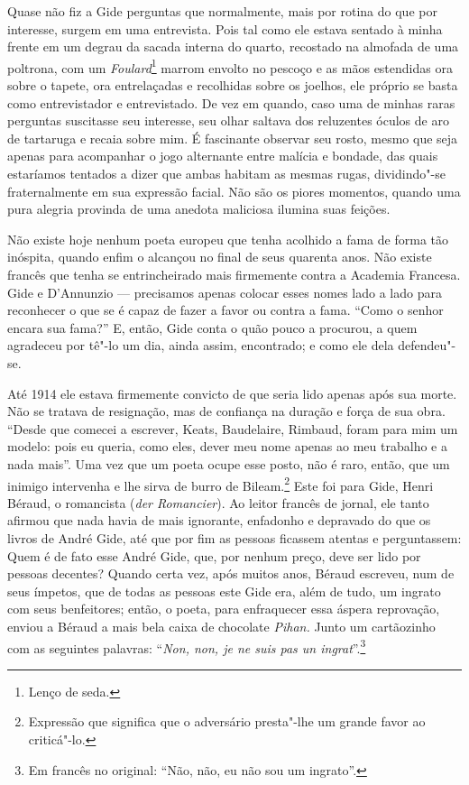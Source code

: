 Quase não fiz a Gide perguntas que normalmente, mais por rotina do que
por interesse, surgem em uma entrevista. Pois tal como ele estava
sentado à minha frente em um degrau da sacada interna do quarto,
recostado na almofada de uma poltrona, com um \emph{Foulard}\footnote{Lenço de seda. \versal{[N. T.]}} marrom envolto no pescoço e as mãos estendidas ora
sobre o tapete, ora entrelaçadas e recolhidas sobre os joelhos, ele
próprio se basta como entrevistador e entrevistado. De vez em
quando, caso uma de minhas raras perguntas suscitasse seu interesse, seu
olhar saltava dos reluzentes óculos de aro de tartaruga e recaia sobre
mim. É fascinante observar seu rosto, mesmo que seja apenas para
acompanhar o jogo alternante entre malícia e bondade, das quais
estaríamos tentados a dizer que ambas habitam as mesmas rugas,
dividindo"-se fraternalmente em sua expressão facial. Não são os piores
momentos, quando uma pura alegria provinda de uma anedota maliciosa
ilumina suas feições.

Não existe hoje nenhum poeta europeu que tenha acolhido a fama de forma
tão inóspita, quando enfim o alcançou no final de seus quarenta anos.
Não existe francês que tenha se entrincheirado mais firmemente contra a
Academia Francesa. Gide e D'Annunzio --- precisamos apenas colocar esses
nomes lado a lado para reconhecer o que se é capaz de fazer a favor ou
contra a fama. ``Como o senhor encara sua fama?'' E, então, Gide conta o
quão pouco a procurou, a quem agradeceu por tê"-lo um dia, ainda assim,
encontrado; e como ele dela defendeu"-se.

Até 1914 ele estava firmemente convicto de que seria lido apenas após
sua morte. Não se tratava de resignação, mas de confiança na duração e
força de sua obra. ``Desde que comecei a escrever, Keats, Baudelaire,
Rimbaud, foram para mim um modelo: pois eu queria, como eles, dever meu
nome apenas ao meu trabalho e a nada mais''. Uma vez que um poeta ocupe
esse posto, não é raro, então, que um inimigo intervenha e lhe sirva de
burro de Bileam.\footnote{Expressão que significa que o adversário
  presta"-lhe um grande favor ao criticá"-lo. \versal{[N. T.]}} Este foi para Gide, Henri Béraud, o romancista (\emph{der
Romancier}). Ao leitor francês de jornal, ele tanto afirmou que nada
havia de mais ignorante, enfadonho e depravado do que os livros de André
Gide, até que por fim as pessoas ficassem atentas e perguntassem: Quem é
de fato esse André Gide, que, por nenhum preço, deve ser lido por
pessoas decentes? Quando certa vez, após muitos anos, Béraud escreveu,
num de seus ímpetos, que de todas as pessoas este Gide era, além de
tudo, um ingrato com seus benfeitores; então, o poeta, para enfraquecer
essa áspera reprovação, enviou a Béraud a mais bela caixa de chocolate
\emph{Pihan.} Junto um cartãozinho com as seguintes palavras:
``\emph{Non, non, je ne suis pas un ingrat}''.\footnote{Em francês no original: ``Não,
  não, eu não sou um ingrato''. \versal{[N. T.]}}

